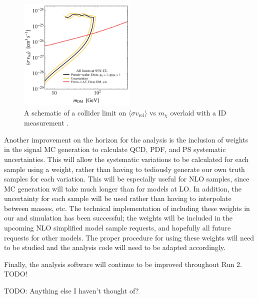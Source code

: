 \begin{figure}[h]
\centering
\includegraphics[width=0.5\textwidth]{Figures/id.png}
\caption{A schematic of a collider limit on $\langle \sigma v_\text{rel} \rangle$ vs $m_\chi$ overlaid with a ID measurement \cite{Boveia:2016mrp}.}
\label{fig:id}
\end{figure}

Another improvement on the horizon for the analysis is the inclusion of weights in the signal MC generation to calculate QCD, PDF, and PS systematic uncertainties. This will allow the systematic variations to be calculated for each sample using a weight, rather than having to tediously generate our own truth samples for each variation. This will be especially useful for NLO samples, since MC generation will take much longer than for models at LO. In addition, the uncertainty for each sample will be used rather than having to interpolate between masses, etc. The technical implementation of including these weights in our \madgraph and \pythia simulation has been successful; the weights will be included in the upcoming NLO simplified model sample requests, and hopefully all future requests for other models. The proper procedure for using these weights will need to be studied and the analysis code will need to be adapted accordingly.

Finally, the \monoZ analysis software will continue to be improved throughout Run 2. {\color{red}TODO!}
 
{\color{red}TODO: Anything else I haven't thought of?}

